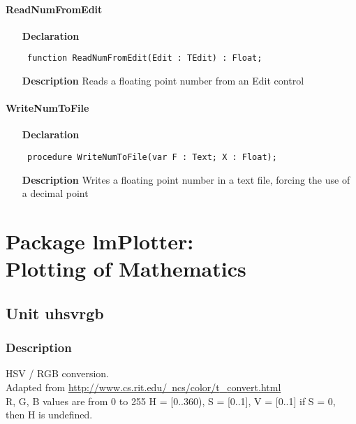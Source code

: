 \documentclass[12pt,a4paper,oneside]{report}
\newcommand{\declarationitem}[1]{\textbf{#1}}
\newcommand{\descriptiontitle}[1]{\textbf{#1}}
\newcommand{\code}[1]{\texttt{#1}}
\begin{document}
\subsubsection{ReadNumFromEdit}
\label{uwinstr-ReadNumFromEdit}
\begin{itemize}\item[\declarationitem{Declaration}\hfill]
	\begin{flushleft}
		\code{
			function ReadNumFromEdit(Edit : TEdit) : Float;}
		
	\end{flushleft}
	
	\par
	\item[\descriptiontitle{Description}]
	Reads a floating point number from an Edit control
	
\end{itemize}
\subsubsection{WriteNumToFile}
\label{uwinstr-WriteNumToFile}
\begin{itemize}\item[\declarationitem{Declaration}\hfill]
	\begin{flushleft}
		\code{
			procedure WriteNumToFile(var F : Text; X : Float);}
		
	\end{flushleft}
	
	\par
	\item[\descriptiontitle{Description}]
	Writes a floating point number in a text file, forcing the use of a decimal point
	
\end{itemize}
\chapter[Package lmPlotter]{Package lmPlotter: \\ Plotting of Mathematics}\label{package-lmPlotter}
\section{Unit uhsvrgb}
\label{uhsvrgb}
\subsection{Description}
HSV / RGB conversion. \\ 
Adapted from \href{http://www.cs.rit.edu/~ncs/color/t_convert.html}{http://www.cs.rit.edu/~ncs/color/t{\_}convert.html} \\ R, G, B values are from 0 to 255 H = [0..360), S = [0..1], V = [0..1] if S = 0, then H is undefined. 
\end{document}
